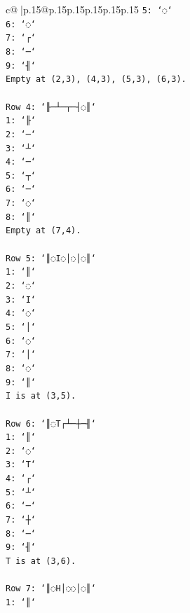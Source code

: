 \documentclass{article}
\begin{document}
{\begin{supertabular}{c@{$\;$}|p{.15\linewidth}@{}p{.15\linewidth}p{.15\linewidth}p{.15\linewidth}p{.15\linewidth}p{.15\linewidth}}
{{{\texttt{5: `◌`} \\
\texttt{6: `◌`} \\
\texttt{7: `┌`} \\
\texttt{8: `─`} \\
\texttt{9: `╢`} \\
\texttt{Empty at (2,3), (4,3), (5,3), (6,3).} \\
\\ 
\texttt{Row 4: `╟─┴─┬─┤◌║`} \\
\texttt{1: `╟`} \\
\texttt{2: `─`} \\
\texttt{3: `┴`} \\
\texttt{4: `─`} \\
\texttt{5: `┬`} \\
\texttt{6: `─`} \\
\texttt{7: `◌`} \\
\texttt{8: `║`} \\
\texttt{Empty at (7,4).} \\
\\ 
\texttt{Row 5: `║◌I◌│◌│◌║`} \\
\texttt{1: `║`} \\
\texttt{2: `◌`} \\
\texttt{3: `I`} \\
\texttt{4: `◌`} \\
\texttt{5: `│`} \\
\texttt{6: `◌`} \\
\texttt{7: `│`} \\
\texttt{8: `◌`} \\
\texttt{9: `║`} \\
\texttt{I is at (3,5).} \\
\\ 
\texttt{Row 6: `║◌T┌┴─┼─╢`} \\
\texttt{1: `║`} \\
\texttt{2: `◌`} \\
\texttt{3: `T`} \\
\texttt{4: `┌`} \\
\texttt{5: `┴`} \\
\texttt{6: `─`} \\
\texttt{7: `┼`} \\
\texttt{8: `─`} \\
\texttt{9: `╢`} \\
\texttt{T is at (3,6).} \\
\\ 
\texttt{Row 7: `║◌H│◌◌│◌║`} \\
\texttt{1: `║`} \\
}}}
\end{supertabular}}
\end{document}
